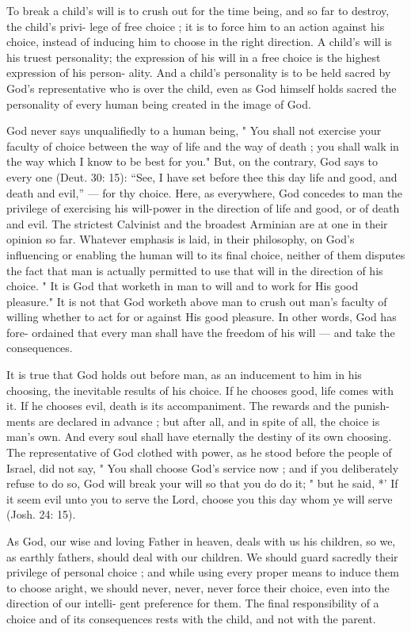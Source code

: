 \documentclass[
]{book}
\begin{document}
To break a child's will is to crush out for the time being, and so far to destroy, the child's privi- lege of free choice ; it is to force him to an action against his choice, instead of inducing him to choose in the right direction. A child's will is his truest personality; the expression of his will in a free choice is the highest expression of his person- ality. And a child's personality is to be held sacred by God's representative who is over the child, even as God himself holds sacred the personality of every human being created in the image of God.

God never says unqualifiedly to a human being, " You shall not exercise your faculty of choice between the way of life and the way of death ; you shall walk in the way which I know to be best for you." But, on the contrary, God says to every one (Deut. 30: 15): ``See, I have set before thee this day life and good, and death and evil,'' --- for thy choice. Here, as everywhere, God concedes to man the privilege of exercising his will-power in the direction of life and good, or of death and evil. The strictest Calvinist and the broadest Arminian are at one in their opinion so far. Whatever emphasis is laid, in their philosophy, on God's influencing or enabling the human will to its final choice, neither of them disputes the fact that man is actually permitted to use that will in the direction of his choice. " It is God that worketh in man to will and to work for His good pleasure." It is not that God worketh above man to crush out man's faculty of willing whether to act for or against His good pleasure. In other words, God has fore- ordained that every man shall have the freedom of his will --- and take the consequences.

It is true that God holds out before man, as an inducement to him in his choosing, the inevitable results of his choice. If he chooses good, life comes with it. If he chooses evil, death is its accompaniment. The rewards and the punish- ments are declared in advance ; but after all, and in spite of all, the choice is man's own. And every soul shall have eternally the destiny of its own choosing. The representative of God clothed with power, as he stood before the people of Israel, did not say, " You shall choose God's service now ; and if you deliberately refuse to do so, God will break your will so that you do do it; " but he said, *' If it seem evil unto you to serve the Lord, choose you this day whom ye will serve (Josh. 24: 15).

As God, our wise and loving Father in heaven, deals with us his children, so we, as earthly fathers, should deal with our children. We should guard sacredly their privilege of personal choice ; and while using every proper means to induce them to choose aright, we should never, never, never force their choice, even into the direction of our intelli- gent preference for them. The final responsibility of a choice and of its consequences rests with the child, and not with the parent.
\end{document}
